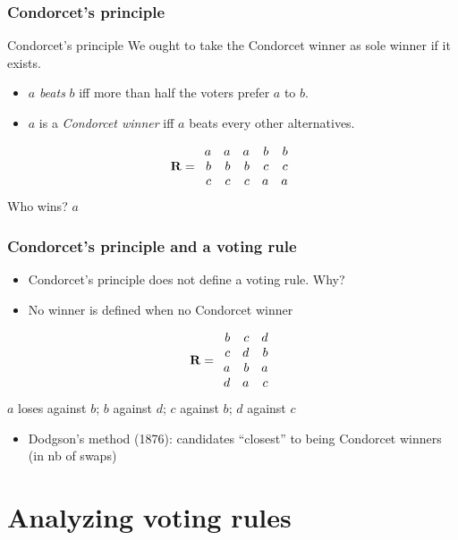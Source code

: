 \documentclass[french, english]{beamer}
\begin{document}
\begin{frame}
	\frametitle{Condorcet’s principle}
	\begin{block}{Condorcet’s principle}
		We ought to take the Condorcet winner as sole winner if it exists.
		\begin{itemize}
			\item $a$ \emph{beats} $b$ iff more than half the voters prefer $a$ to $b$.
			\item $a$ is a \emph{Condorcet winner} iff $a$ beats every other alternatives.
		\end{itemize}
	\end{block}
	\vfill
	\begin{equation}
		\mathbf{R} =
		\begin{array}{rrrrr}
			a	&	a	&	a	&	b	&	b\\
			b	&	b	&	b	&	c	&	c\\
			c	&	c	&	c	&	a	&	a
		\end{array}
	\end{equation}
	 Who wins? \pause $a$
\end{frame}

\begin{frame}
	\frametitle{Condorcet’s principle and a voting rule}
	\begin{itemize}
		\item Condorcet’s principle does not define a voting rule. Why? \pause
		\item No winner is defined when no Condorcet winner
	\end{itemize}
	\begin{equation}
		\mathbf{R} =
		\begin{array}{rrr}
			b	&	c	&	d\\
			c	&	d	&	b\\
			a	&	b	&	a\\
			d	&	a	&	c
		\end{array}
	\end{equation}
	\pause
	$a$ loses against $b$; $b$ against $d$; $c$ against $b$; $d$ against $c$
	\begin{itemize}
		\item Dodgson’s method (1876): candidates “closest” to being Condorcet winners {\tiny (in nb of swaps)}
	\end{itemize}
\end{frame}

\section{Analyzing voting rules}
\end{document}
